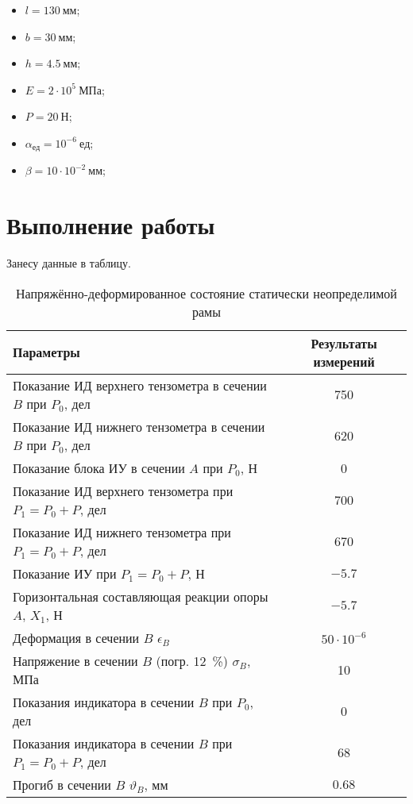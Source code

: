 \begin{itemize}
    \item $l = 130~мм$;
    \item $b = 30~мм$;
    \item $h = 4.5~мм$;
    \item $E = 2 \cdot 10^5~МПа$;
    \item $P = 20~Н$;
    \item $\alpha_{ед} = 10^{-6}~ед$;
    \item $\beta = 10 \cdot 10^{-2}~мм$;
\end{itemize}

\section{Выполнение работы}

Занесу данные в таблицу.
\begin{table}[H]
    \centering
    \caption{Напряжённо-деформированное состояние статически неопределимой рамы}
    \label{tab:static-undefinable-beam}
    \begin{tabular}{|l|c|}
        \hline
        Параметры                                                     & Результаты измерений \\ \hline
        Показание ИД верхнего тензометра в сечении $B$ при $P_0$, дел & 750                  \\ \hline
        Показание ИД нижнего тензометра в сечении $B$ при $P_0$, дел  & 620                  \\ \hline
        Показание блока ИУ в сечении $A$ при $P_0$, Н                 & 0                    \\ \hline
        Показание ИД верхнего тензометра при $P_1 = P_0 + P$, дел     & 700                  \\ \hline
        Показание ИД нижнего тензометра при $P_1 = P_0 + P$, дел      & 670                  \\ \hline
        Показание ИУ при $P_1 = P_0 + P$, Н                           & $-5.7$               \\ \hline
        Горизонтальная составляющая реакции опоры $A$, $X_1$, Н       & $-5.7$               \\ \hline
        Деформация в сечении $B$ $\epsilon_B$                         & $50 \cdot 10^{-6}$   \\ \hline
        Напряжение в сечении $B$ (погр. 12~\%) $\sigma_B$, МПа        & 10                   \\ \hline
        Показания индикатора в сечении $B$ при $P_0$, дел             & 0                    \\ \hline
        Показания индикатора в сечении $B$ при $P_1 = P_0 + P$, дел   & 68                   \\ \hline
        Прогиб в сечении $B$ $\vartheta_B$, мм                        & $0.68$               \\ \hline
    \end{tabular}
\end{table}

